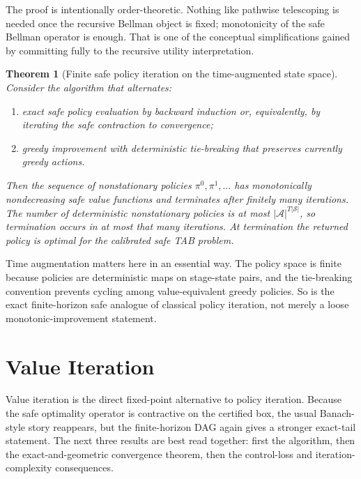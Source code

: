 \documentclass{article}
\newtheorem{theorem}{Theorem}[section]
\theoremstyle{remark}
\newcommand{\cS}{\mathcal{S}}
\newcommand{\cA}{\mathcal{A}}
\begin{document}
The proof is intentionally order-theoretic.
Nothing like pathwise telescoping is needed once the recursive Bellman object is fixed; monotonicity of the safe Bellman operator is enough.
That is one of the conceptual simplifications gained by committing fully to the recursive utility interpretation.


\begin{theorem}[Finite safe policy iteration on the time-augmented state space]
\label{thm:policy-iteration}
Consider the algorithm that alternates:
\begin{enumerate}[leftmargin=1.5em,itemsep=2pt]
    \item exact safe policy evaluation by backward induction or, equivalently, by iterating the safe contraction to convergence;
    \item greedy improvement with deterministic tie-breaking that preserves currently greedy actions.
\end{enumerate}
Then the sequence of nonstationary policies $\pi^0,\pi^1,\dots$ has monotonically nondecreasing safe value functions and terminates after finitely many iterations.
The number of deterministic nonstationary policies is at most $|\cA|^{T|\cS|}$, so termination occurs in at most that many iterations.
At termination the returned policy is optimal for the calibrated safe TAB problem.
\end{theorem}

Time augmentation matters here in an essential way.
The policy space is finite because policies are deterministic maps on stage-state pairs, and the tie-breaking convention prevents cycling among value-equivalent greedy policies.
So  is the exact finite-horizon safe analogue of classical policy iteration, not merely a loose monotonic-improvement statement.


\section{Value Iteration}
\label{sec:value-iteration}

Value iteration is the direct fixed-point alternative to policy iteration.
Because the safe optimality operator is contractive on the certified box, the usual Banach-style story reappears, but the finite-horizon DAG again gives a stronger exact-tail statement.
The next three results are best read together: first the algorithm, then the exact-and-geometric convergence theorem, then the control-loss and iteration-complexity consequences.
\end{document}
